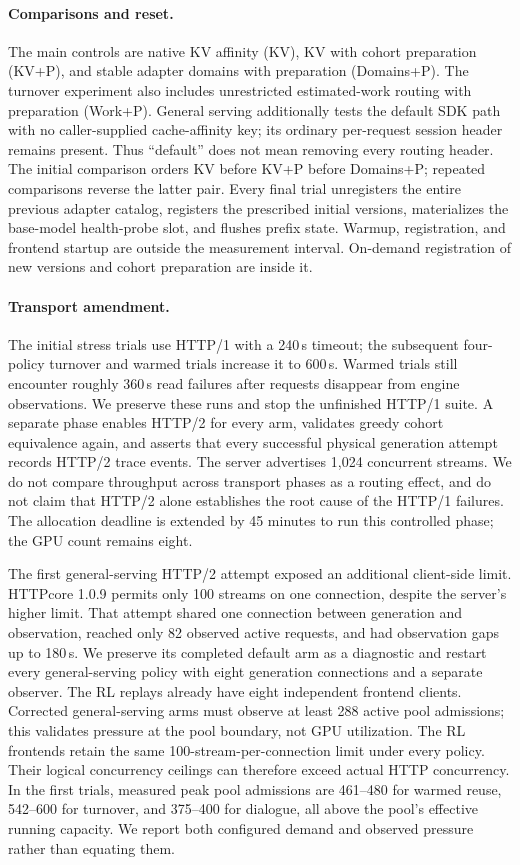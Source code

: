 \paragraph{Comparisons and reset.}
The main controls are native KV affinity (KV), KV with cohort preparation
(KV+P), and stable adapter domains with preparation (Domains+P). The turnover
experiment also includes unrestricted estimated-work routing with preparation
(Work+P). General serving additionally tests the default SDK path with no
caller-supplied cache-affinity key; its ordinary per-request session header
remains present. Thus ``default'' does not mean removing every routing header.
The initial comparison orders KV before KV+P before Domains+P;
repeated comparisons reverse the latter pair. Every final trial unregisters the
entire previous adapter catalog, registers the prescribed initial versions,
materializes the base-model health-probe slot, and flushes prefix state.
Warmup, registration, and frontend startup are outside the measurement interval.
On-demand registration of new versions and cohort preparation are inside it.

\paragraph{Transport amendment.}
The initial stress trials use HTTP/1 with a 240\,s timeout; the subsequent
four-policy turnover and warmed trials increase it to 600\,s. Warmed trials
still encounter roughly 360\,s read failures after requests disappear from
engine observations. We preserve these runs and stop the unfinished HTTP/1
suite. A separate phase enables HTTP/2 for every arm, validates greedy cohort
equivalence again, and asserts that every successful physical generation
attempt records HTTP/2 trace events. The server advertises 1,024 concurrent
streams. We do not compare throughput across transport phases as a routing
effect, and do not claim that HTTP/2 alone establishes the root cause of the
HTTP/1 failures. The allocation deadline is extended by 45 minutes to run this
controlled phase; the GPU count remains eight.

The first general-serving HTTP/2 attempt exposed an additional client-side
limit. HTTPcore 1.0.9 permits only 100 streams on one connection, despite the
server's higher limit. That attempt shared one connection between generation
and observation, reached only 82 observed active requests, and had observation
gaps up to 180\,s. We preserve its completed default arm as a diagnostic and
restart every general-serving policy with eight generation connections and a
separate observer. The RL replays already have eight independent frontend
clients. Corrected general-serving arms must observe at least 288 active pool
admissions; this validates pressure at the pool boundary, not GPU utilization.
The RL frontends retain the same 100-stream-per-connection limit under every
policy. Their logical concurrency ceilings can therefore exceed actual HTTP
concurrency. In the first trials, measured peak pool admissions are 461--480
for warmed reuse, 542--600 for turnover, and 375--400 for dialogue, all above
the pool's effective running capacity. We report both configured demand and
observed pressure rather than equating them.

